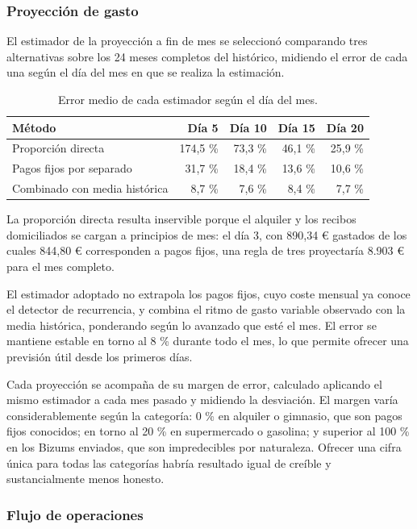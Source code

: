 \subsubsection{Proyección de gasto}

El estimador de la proyección a fin de mes se seleccionó comparando tres
alternativas sobre los 24 meses completos del histórico, midiendo el error de
cada una según el día del mes en que se realiza la estimación.

\begin{table}[h]
\centering
\begin{tabular}{lrrrr}
\toprule
\textbf{Método} & \textbf{Día 5} & \textbf{Día 10} & \textbf{Día 15} & \textbf{Día 20} \\
\midrule
Proporción directa            & 174,5 \% & 73,3 \% & 46,1 \% & 25,9 \% \\
Pagos fijos por separado      & 31,7 \%  & 18,4 \% & 13,6 \% & 10,6 \% \\
Combinado con media histórica & 8,7 \%   & 7,6 \%  & 8,4 \%  & 7,7 \% \\
\bottomrule
\end{tabular}
\caption{Error medio de cada estimador según el día del mes.}
\end{table}

La proporción directa resulta inservible porque el alquiler y los recibos
domiciliados se cargan a principios de mes: el día 3, con 890,34 € gastados de
los cuales 844,80 € corresponden a pagos fijos, una regla de tres proyectaría
8.903 € para el mes completo.

El estimador adoptado no extrapola los pagos fijos, cuyo coste mensual ya conoce
el detector de recurrencia, y combina el ritmo de gasto variable observado con
la media histórica, ponderando según lo avanzado que esté el mes. El error se
mantiene estable en torno al 8 \% durante todo el mes, lo que permite ofrecer
una previsión útil desde los primeros días.

Cada proyección se acompaña de su margen de error, calculado aplicando el mismo
estimador a cada mes pasado y midiendo la desviación. El margen varía
considerablemente según la categoría: 0 \% en alquiler o gimnasio, que son pagos
fijos conocidos; en torno al 20 \% en supermercado o gasolina; y superior al
100 \% en los Bizums enviados, que son impredecibles por naturaleza. Ofrecer una
cifra única para todas las categorías habría resultado igual de creíble y
sustancialmente menos honesto.

\subsubsection{Flujo de operaciones}

